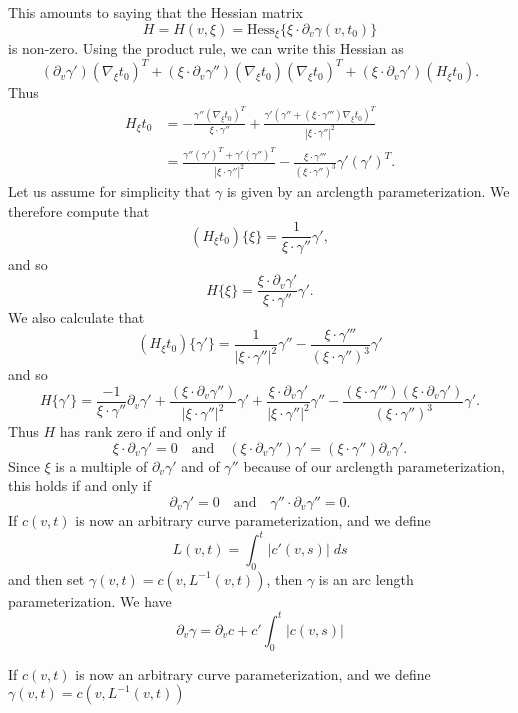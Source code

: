\documentclass{article}
\theoremstyle{plain}
\theoremstyle{remark}
\theoremstyle{definition}
\begin{document}
This amounts to saying that the Hessian matrix
%
\[ H = H(v,\xi) = \text{Hess}_\xi \{ \xi \cdot \partial_v \gamma(v,t_0) \} \]
%
is non-zero. Using the product rule, we can write this Hessian as
%
\[ (\partial_v \gamma') (\nabla_\xi t_0)^T + (\xi \cdot \partial_v \gamma'') (\nabla_\xi t_0) (\nabla_\xi t_0)^T + (\xi \cdot \partial_v \gamma') (H_\xi t_0). \]
%
Thus
%
\begin{align*}
	H_\xi t_0 &= - \frac{\gamma'' (\nabla_\xi t_0)^T}{\xi \cdot \gamma''} + \frac{\gamma' ( \gamma'' + (\xi \cdot \gamma''') \nabla_\xi t_0 )^T}{|\xi \cdot \gamma''|^2}\\
	&= \frac{\gamma'' (\gamma')^T + \gamma' (\gamma'')^T}{|\xi \cdot \gamma''|^2} - \frac{\xi \cdot \gamma'''}{(\xi \cdot \gamma'')^3} \gamma' (\gamma')^T.
\end{align*}
%
Let us assume for simplicity that $\gamma$ is given by an arclength parameterization. We therefore compute that
%
\[ (H_\xi t_0) \{ \xi \} = \frac{1}{\xi \cdot \gamma''} \gamma', \]
%
and so
%
\[ H \{ \xi \} = \frac{\xi \cdot \partial_v \gamma'}{\xi \cdot \gamma''} \gamma'. \]
%
We also calculate that
%
\[ (H_\xi t_0) \{ \gamma' \} = \frac{1}{|\xi \cdot \gamma''|^2} \gamma'' - \frac{\xi \cdot \gamma'''}{(\xi \cdot \gamma'')^3} \gamma' \]
%
and so
%
\[ H \{ \gamma' \} = \frac{-1}{\xi \cdot \gamma''} \partial_v \gamma' + \frac{(\xi \cdot \partial_v \gamma'')}{|\xi \cdot \gamma''|^2} \gamma' + \frac{\xi \cdot \partial_v \gamma'}{|\xi \cdot \gamma''|^2} \gamma'' - \frac{(\xi \cdot \gamma''')(\xi \cdot \partial_v \gamma')}{(\xi \cdot \gamma'')^3} \gamma'. \]
%
Thus $H$ has rank zero if and only if
%
\[ \xi \cdot \partial_v \gamma' = 0 \quad\text{and}\quad (\xi \cdot \partial_v \gamma'') \gamma' = (\xi \cdot \gamma'') \partial_v \gamma'. \]
%
Since $\xi$ is a multiple of $\partial_v \gamma'$ and of $\gamma''$ because of our arclength parameterization, this holds if and only if
%
\[ \partial_v \gamma' = 0 \quad\text{and}\quad \gamma'' \cdot \partial_v \gamma'' = 0. \]
%
If $c(v,t)$ is now an arbitrary curve parameterization, and we define
%
\[ L(v,t) = \int_0^t |c'(v,s)|\; ds \]
%
and then set $\gamma(v,t) = c(v, L^{-1}(v,t))$, then $\gamma$ is an arc length parameterization. We have
%
\[ \partial_v \gamma = \partial_v c + c' \int_0^t |c(v,s)| \]

If $c(v,t)$ is now an arbitrary curve parameterization, and we define $\gamma(v,t) = c(v, L^{-1}(v,t))$
\end{document}
